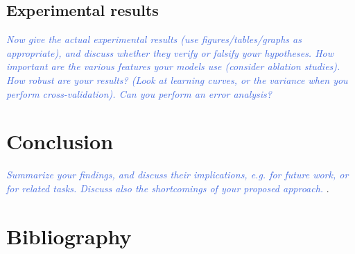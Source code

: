 \documentclass[11pt,letterpaper]{article}
\newcommand{\blue}[1]{\textcolor{RoyalBlue}{#1}}
\newcommand{\instructions}[1]{\blue{\textit{#1}}}
\begin{document}
\subsection{Experimental results}
\label{sec:experimental-results}
\instructions{Now give the actual experimental results (use figures/tables/graphs as appropriate), and discuss whether they verify or falsify your hypotheses. How important are the various features your models use (consider ablation studies). How robust are your results? (Look at learning curves, or the variance when you perform cross-validation). Can you perform an error analysis?}

\section{Conclusion}
\instructions{Summarize your findings, and discuss their implications, e.g. for future work, or for related tasks. Discuss also the shortcomings of your proposed approach. }. 


\section*{Bibliography}
{}

\end{document}
